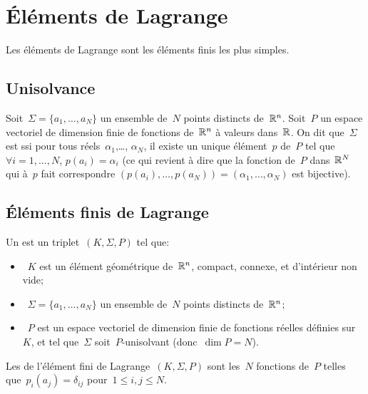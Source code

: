 \medskip
\section{Éléments de Lagrange}

Les éléments de Lagrange sont les éléments finis les plus simples.

\medskip
\subsection{Unisolvance}\label{Sec-unisolvance}

\begin{definition}[Unisolvance]
Soit~$\Sigma=\{a_1,\ldots, a_N\}$ un ensemble de~$N$ points distincts de~$\mathbb R^n$.
Soit~$P$ un espace vectoriel de dimension finie de fonctions de~$\mathbb R^n$ à valeurs dans~$\mathbb R$.
On dit que~$\Sigma$ est  ssi pour tous réels~$\alpha_1$,\ldots, $\alpha_N$, il existe un unique élément~$p$ de~$P$ tel que~$\forall i=1,\ldots, N$, $p(a_i) = \alpha_i$ (ce qui revient à dire que la fonction de~$P$ dans~$\mathbb R^N$ qui à~$p$ fait correspondre $(p(a_i),\ldots, p(a_N))=(\alpha_1,\ldots, \alpha_N)$ est bijective).
\end{definition}

\medskip
\subsection{Éléments finis de Lagrange}

\begin{definition}
Un  est un triplet~$(K, \Sigma, P)$ tel que:
\begin{itemize}
\item~$K$ est un élément géométrique de~$\mathbb R^n$, compact, connexe, et d'intérieur
	non vide;
\item~$\Sigma=\{a_1,\ldots, a_N\}$ un ensemble de~$N$ points distincts de~$\mathbb R^n$;
\item~$P$ est un espace vectoriel de dimension finie de fonctions réelles définies sur~$K$, et tel
	que~$\Sigma$ soit~$P$-unisolvant (donc~$\dim P = N$).
\end{itemize}
\end{definition}
\medskip
Les  de l'élément fini de Lagrange~$(K, \Sigma, P)$ sont les~$N$ fonctions de~$P$ telles que~$p_i(a_j)=\delta_{ij}$ pour~$1\le i,j\le N$.
\medskip
